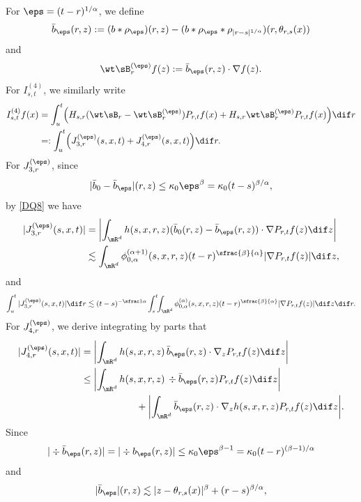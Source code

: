 \step\label{Step 4}
For $\eps=(t-r)^{1/\alpha}$, we define
\[
\bar b_\eps(r,z):=(b*\rho_\eps)(r,z)-(b*\rho_{\eps}*\rho_{|r-s|^{1/\alpha}})(r,\theta_{r,s}(x))
\]
and\vspace*{-3pt}
\[
\wt\sB^{(\eps)}_r f(z):=\bar b_\eps(r,z)\cdot\nabla f(z).
\]
For $I^{(4)}_{s,t} $, we similarly write\vspace*{-3pt}
\begin{align*}
I^{(4)}_{s,t} f(x)&=\int^t_{u}\Bigl(H_{s,r}(\wt\sB_r-\wt\sB^{(\eps)}_r)P_{r,t}f(x)
+H_{s,r}\wt\sB^{(\eps)}_r P_{r,t}f(x)\Bigr)\dif r\\
&=:\int^t_{u}\Bigl(J^{(\eps)}_{3,r}(s,x,t)+J^{(\eps)}_{4,r}(s,x,t)\Bigr)\dif r.
\end{align*}
For $J^{(\eps)}_{3,r}$, since\vspace*{-3pt}
\[
|\bar b_0-\bar b_\eps|(r,z)\leq \kappa_0\eps^\beta=\kappa_0(t-s)^{\beta/\alpha},
\]
by \eqref{DQ8} we have\vspace*{-3pt}
\begin{align*}
|J^{(\eps)}_{3,r}(s,x,t)|&=\left|\int_{\mR^d}h(s,x,r,z)(\bar b_0(r,z)-\bar b_\eps(r,z))\cdot \nabla P_{r,t}f(z)\dif z\right|\\
&\lesssim\int_{\mR^d}\phi^{(\alpha+1)}_{0,\alpha}(s,x,r,z)(t-r)^{\sfrac{\beta}{\alpha}}|\nabla P_{r,t}f(z)|\dif z,
\end{align*}
and\vspace*{-3pt}
\[
\int^t_{u}|J^{(\eps)}_{{3},r}(s,x,t)|\dif r\lesssim
(t-s)^{-\sfrac1\alpha}\int^t_s\!\!\int_{\mR^d}\phi^{(\alpha)}_{0,\alpha}(s,x,r,z)(t-r)^{\sfrac{\beta}{\alpha}}|\nabla P_{r,t}f(z)|\dif z\dif r.
\]
For $J^{(\eps)}_{4,r}$, we derive integrating by parts that\vspace*{-3pt}
\begin{align*}
|J^{(\eps)}_{4,r}(s,x,t)|&=\left|\int_{\mR^d}h(s,x,r,z)\, \bar b_\eps(r,z)\cdot\nabla_z P_{r,t}f(z)\dif z\right|
\\&\leq\left|\int_{\mR^d}h(s,x,r,z)\, \div \bar b_\eps(r,z) P_{r,t}f(z)\dif z\right|
\\&\hspace*{2cm}+\biggl|\int_{\mR^d} \bar b_\eps(r,z)\cdot \nabla_z h(s,x,r,z) P_{r,t}f(z)\dif z\biggr|.
\end{align*}
Since\vspace*{-3pt}
\[
|\div \bar b_\eps(r,z)|=|\div b_\eps(r,z)|\leq \kappa_0\eps^{\beta-1}=\kappa_0(t-r)^{(\beta-1)/\alpha}
\]
and\vspace*{-3pt}\enlargethispage{5pt}%
\[
|\bar b_\eps|(r,z)\lesssim |z-\theta_{r,s}(x)|^\beta+(r-s)^{\beta/\alpha},
\]
